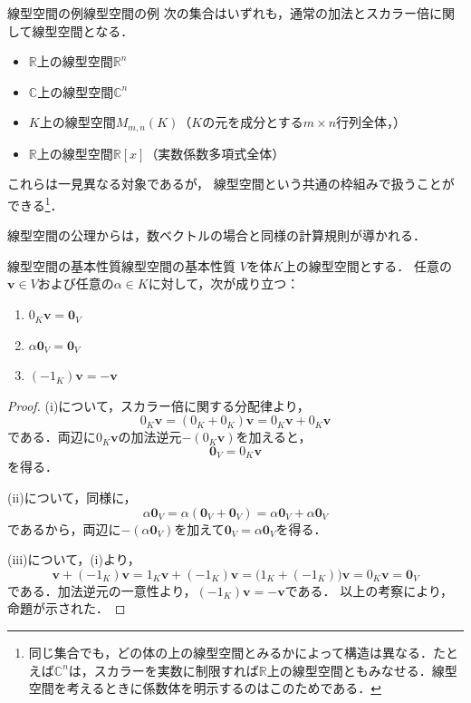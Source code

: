\begin{example}{線型空間の例}{線型空間の例}
次の集合はいずれも，通常の加法とスカラー倍に関して線型空間となる．

\begin{itemize}
\item $\mathbb{R}$上の線型空間$\mathbb{R}^n$
\item $\mathbb{C}$上の線型空間$\mathbb{C}^n$
\item $K$上の線型空間$M_{m,n}(K)$（$K$の元を成分とする$m\times n$行列全体，）
\item $\mathbb{R}$上の線型空間$\mathbb{R}[x]$（実数係数多項式全体）
\end{itemize}

これらは一見異なる対象であるが，
線型空間という共通の枠組みで扱うことができる\footnote{同じ集合でも，どの体の上の線型空間とみるかによって構造は異なる．たとえば$\mathbb{C}^n$は，スカラーを実数に制限すれば$\mathbb{R}$上の線型空間ともみなせる．線型空間を考えるときに係数体を明示するのはこのためである．}．
\end{example}

線型空間の公理からは，数ベクトルの場合と同様の計算規則が導かれる．

\begin{prop}{線型空間の基本性質}{線型空間の基本性質}
  $V$を体$K$上の線型空間とする．
  任意の$\bm{v} \in V$および任意の$\alpha \in K$に対して，次が成り立つ：
  \begin{enumerate}[label=(\roman*),leftmargin=3.2em]
    \item $0_K \bm{v} = \bm{0}_V$
    \item $\alpha \bm{0}_V = \bm{0}_V$
    \item $(-1_K)\bm{v} = -\bm{v}$
  \end{enumerate}
\end{prop}

\begin{leftbar}
\begin{proof}
  (i)について，スカラー倍に関する分配律より，
  \[
    0_K \bm{v} = (0_K + 0_K)\bm{v} = 0_K \bm{v} + 0_K \bm{v}
  \]
  である．両辺に$0_K \bm{v}$の加法逆元$-(0_K \bm{v})$を加えると，
  \[
    \bm{0}_V = 0_K \bm{v}
  \]
  を得る．

  (ii)について，同様に，
  \[
    \alpha \bm{0}_V = \alpha(\bm{0}_V + \bm{0}_V) = \alpha \bm{0}_V + \alpha \bm{0}_V
  \]
  であるから，両辺に$-(\alpha \bm{0}_V)$を加えて$\bm{0}_V = \alpha \bm{0}_V$を得る．

  (iii)について，(i)より，
  \[
    \bm{v} + (-1_K)\bm{v} = 1_K \bm{v} + (-1_K)\bm{v} = \bigl(1_K + (-1_K)\bigr)\bm{v} = 0_K \bm{v} = \bm{0}_V
  \]
  である．加法逆元の一意性より，$(-1_K)\bm{v} = -\bm{v}$である．
  以上の考察により，命題が示された．
\end{proof}
\end{leftbar}

